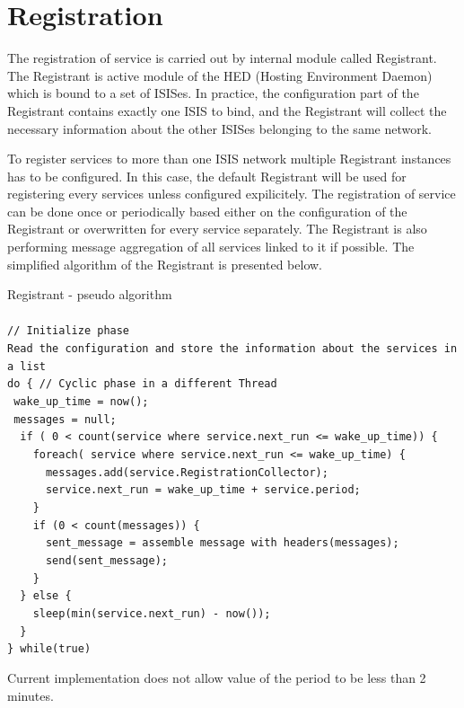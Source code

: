 \documentclass{book}
\begin{document}

\section{Registration} %
\label{sec:service_registration}

The registration of service is carried out by internal module called Registrant. The Registrant is active module of the HED (Hosting Environment Daemon) which is bound to a set of ISISes. In practice, the configuration part of the Registrant contains exactly one ISIS to bind, and the Registrant will collect the necessary information about the other ISISes belonging to the same network.

To register services to more than one ISIS network multiple Registrant instances has to be configured. In this case, the default Registrant will be used for registering every services unless configured expilicitely.
The registration of service can be done once or periodically based either on the configuration of the Registrant or overwritten for every service separately. The Registrant is also performing message aggregation of all services linked to it if possible. The simplified algorithm of the Registrant is presented below.

\begin{framed}
  Registrant - pseudo algorithm\\
  \\
  \verb#// Initialize phase#\\
  \verb#Read the configuration and store the information about the services in a list#\\
  \verb#do { // Cyclic phase in a different Thread#\\
  \verb# wake_up_time = now();#\\
  \verb# messages = null;#\\
  \verb#  if ( 0 < count(service where service.next_run <= wake_up_time)) {#\\
  \verb#    foreach( service where service.next_run <= wake_up_time) {#\\
  \verb#      messages.add(service.RegistrationCollector);#\\
  \verb#      service.next_run = wake_up_time + service.period;#\\
  \verb#    }#\\
  \verb#    if (0 < count(messages)) {#\\
  \verb#      sent_message = assemble message with headers(messages);#\\
  \verb#      send(sent_message);#\\
  \verb#    }#\\
  \verb#  } else {#\\
  \verb#    sleep(min(service.next_run) - now()); #\\
  \verb#  }#\\
  \verb#} while(true)#\\
\end{framed}
Current implementation does not allow value of the period to be less than 2 minutes.
\end{document}
